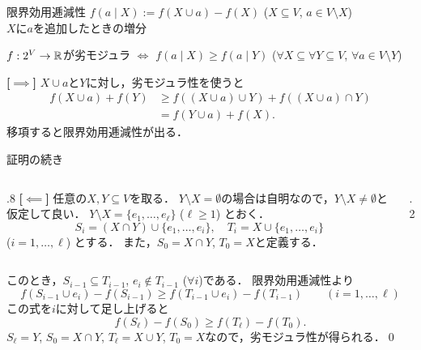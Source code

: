 \documentclass[14pt,aspectratio=169,xcolor=dvipsnames,table,onlytextwidth,dvipdfmx]{beamer}
\begin{document}
\begin{frame}{限界効用逓減性}
    \small
     $f(a \mid X) := f(X \cup a) - f(X)$ ($X \subseteq V$, $a \in V\setminus X$) \\ {\color{gray}\dotfill $X$に$a$を追加したときの増分}
    \begin{lemma}
        $f: 2^V \to \mathbb{R}$が劣モジュラ $\iff$ $f(a \mid X) \geq f(a \mid Y)$ ($\forall X \subseteq \forall Y \subseteq V$, $\forall a \in V\setminus Y$) \\
    \end{lemma}
    \textbf{[$\implies$]} 
    $X \cup a$と$Y$に対し，劣モジュラ性を使うと
    \begin{align*}
        f(X \cup a) + f(Y) &\geq f((X \cup a) \cup Y) + f((X \cup a) \cap Y) \\
        &= f(Y \cup a) + f(X).
    \end{align*}
    移項すると限界効用逓減性が出る．
\end{frame}

\begin{frame}{証明の続き}
    \small
    \begin{columns}[T]
    \begin{column}{.8\textwidth}
    \textbf{[$\impliedby$]}
 任意の$X, Y \subseteq V$を取る．
$Y \setminus X = \emptyset$の場合は自明なので，$Y \setminus X \neq \emptyset$と仮定して良い．
$Y \setminus X = \{e_1, \dots, e_\ell\}$ ($\ell \geq 1$) とおく．
\[
S_i = (X \cap Y)\cup\{e_1, \dots, e_i\}, \quad T_i = X \cup \{e_1, \dots, e_i\} 
\]
($i=1, \dots, \ell$) とする．
また，$S_0 = X\cap Y$, $T_0 = X$と定義する．
    \end{column}
    \begin{column}{.2\textwidth}
    \centering
    \end{column}
    \end{columns}

\pause
\bigskip
このとき，$S_{i-1} \subseteq T_{i-1}$, $e_i \notin T_{i-1}$ ($\forall i$)である．
限界効用逓減性より
\[
    f(S_{i-1} \cup  e_ i ) - f(S_{i-1}) \geq f(T_{i-1} \cup  e_i ) - f(T_{i-1}) \qquad (i=1,\dots,\ell)
\]
この式を$i$に対して足し上げると
\[
    f(S_\ell) - f(S_0) \geq f(T_\ell) - f(T_0).
\]
$S_\ell=Y$, $S_0=X\cap Y$, $T_\ell=X\cup Y$, $T_0 = X$なので，劣モジュラ性が得られる．\qed


\end{frame}
\end{document}
